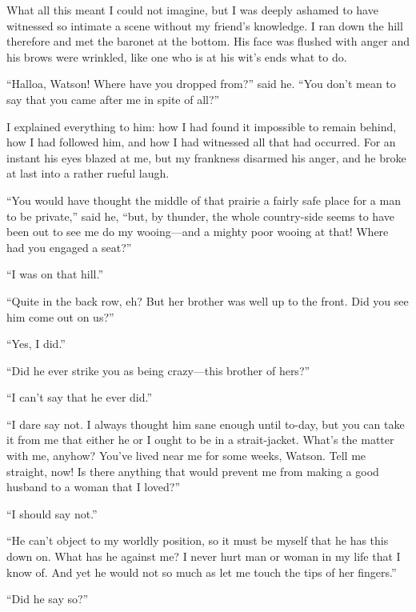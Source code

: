 \documentclass[paper=5.5in:8.5in,BCOR=7mm,twoside,DIV=calc,12pt,usegeometry,openany,chapterprefix,endperiod]{scrbook} %
\begin{document}
What all this meant I could not imagine, but I was deeply ashamed to have witnessed so intimate a scene without my friend's knowledge. I ran down the hill therefore and met the baronet at the bottom. His face was flushed with anger and his brows were wrinkled, like one who is at his wit's ends what to do.

\enquote{Halloa, Watson! Where have you dropped from?} said he. \enquote{You don't mean to say that you came after me in spite of all?}

I explained everything to him: how I had found it impossible to remain behind, how I had followed him, and how I had witnessed all that had occurred. For an instant his eyes blazed at me, but my frankness disarmed his anger, and he broke at last into a rather rueful laugh.

\enquote{You would have thought the middle of that prairie a fairly safe place for a man to be private,} said he, \enquote{but, by thunder, the whole country-side seems to have been out to see me do my wooing\nobreakdash---and a mighty poor wooing at that! Where had you engaged a seat?}

\enquote{I was on that hill.}

\enquote{Quite in the back row, eh? But her brother was well up to the front. Did you see him come out on us?}

\enquote{Yes, I did.}

\enquote{Did he ever strike you as being crazy\nobreakdash---this brother of hers?}

\enquote{I can't say that he ever did.}

\enquote{I dare say not. I always thought him sane enough until to-day, but you can take it from me that either he or I ought to be in a strait-jacket. What's the matter with me, anyhow? You've lived near me for some weeks, Watson. Tell me straight, now! Is there anything that would prevent me from making a good husband to a woman that I loved?}

\enquote{I should say not.}

\enquote{He can't object to my worldly position, so it must be myself that he has this down on. What has he against me? I never hurt man or woman in my life that I know of. And yet he would not so much as let me touch the tips of her fingers.}

\enquote{Did he say so?}
\end{document}
